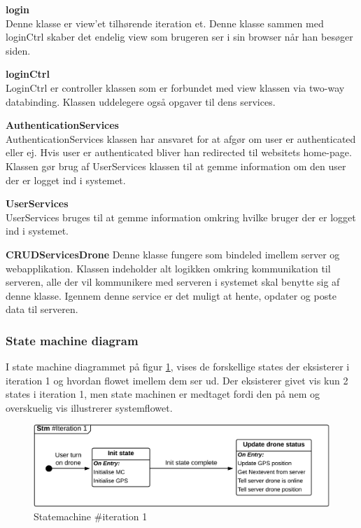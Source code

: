 \vspace{-0.2cm}

\textbf{login} \\
Denne klasse er view'et tilhørende iteration et. Denne klasse sammen med loginCtrl skaber det endelig view som brugeren ser i sin browser når han besøger siden.

\textbf{loginCtrl} \\
LoginCtrl er controller klassen som er forbundet med view klassen via two-way databinding. Klassen uddelegere også opgaver til dens services.

\textbf{AuthenticationServices} \\
AuthenticationServices klassen har ansvaret for at afgør om user er authenticated eller ej. Hvis user er authenticated bliver han redirected til websitets home-page. Klassen gør brug af UserServices klassen til at gemme information om den user der er logget ind i systemet.

\textbf{UserServices}\\
UserServices bruges til at gemme information omkring hvilke bruger der er logget ind i systemet.

\textbf{CRUDServicesDrone}
Denne klasse fungere som bindeled imellem server og webapplikation. Klassen indeholder alt logikken omkring kommunikation til serveren, alle der vil kommunikere med serveren i systemet skal benytte sig af denne klasse. Igennem denne service er det muligt at hente, opdater og poste data til serveren.


\subsubsection*{State machine diagram}
\vspace{-0.1cm}
I state machine diagrammet på figur \ref{fig:Statemachine_iteration1}, vises de forskellige states der eksisterer i iteration 1 og hvordan flowet imellem dem ser ud. Der eksisterer givet vis kun 2 states i iteration 1, men state machinen er medtaget fordi den på nem og overskuelig vis illustrerer systemflowet.
\begin{figure}[H]
	\centering
	\includegraphics[width=1\textwidth]{Billeder/statemachine/State_iteration1.png}
	\vspace{-0.5cm}
	\caption{Statemachine \#iteration 1}
	\label{fig:Statemachine_iteration1}
\end{figure}
